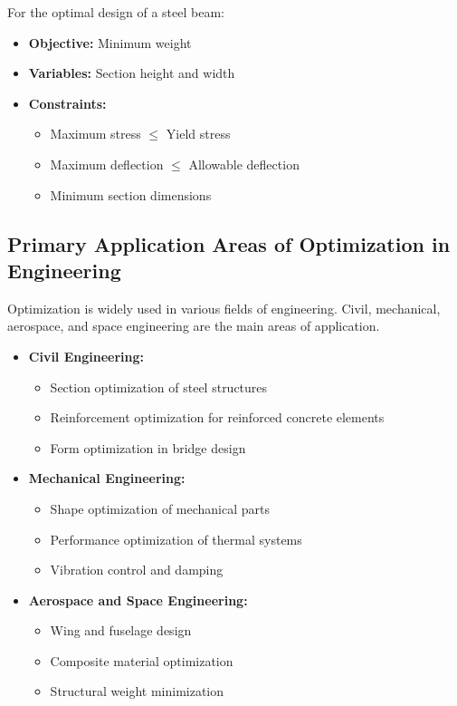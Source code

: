 \begin{tcolorbox}[title=Structural Optimization Example]
For the optimal design of a steel beam:
\begin{itemize}
    \item \textbf{Objective:} Minimum weight
    \item \textbf{Variables:} Section height and width
    \item \textbf{Constraints:} 
        \begin{itemize}
            \item Maximum stress $\leq$ Yield stress
            \item Maximum deflection $\leq$ Allowable deflection
            \item Minimum section dimensions
        \end{itemize}
\end{itemize}
\end{tcolorbox}

\subsection{Primary Application Areas of Optimization in Engineering}
Optimization is widely used in various fields of engineering. Civil, mechanical, aerospace, and space engineering are the main areas of application.

\begin{itemize}
    \item \textbf{Civil Engineering:}
        \begin{itemize}
            \item Section optimization of steel structures
            \item Reinforcement optimization for reinforced concrete elements
            \item Form optimization in bridge design
        \end{itemize}
    \item \textbf{Mechanical Engineering:}
        \begin{itemize}
            \item Shape optimization of mechanical parts
            \item Performance optimization of thermal systems
            \item Vibration control and damping
        \end{itemize}
    \item \textbf{Aerospace and Space Engineering:}
        \begin{itemize}
            \item Wing and fuselage design
            \item Composite material optimization
            \item Structural weight minimization
        \end{itemize}
\end{itemize}


